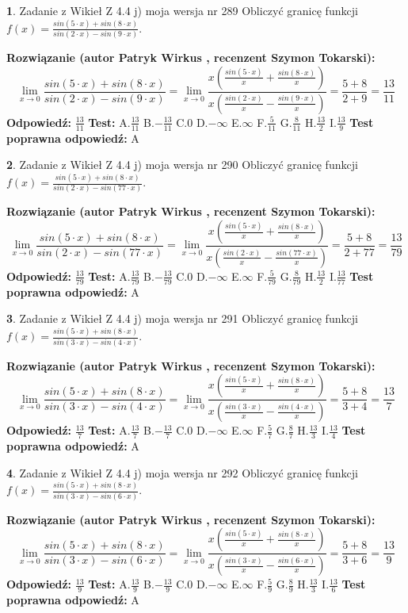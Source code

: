 \documentclass[12pt, a4paper]{article}
\theoremstyle{definition} %
\newtheorem{zad}{}
\newcommand{\zadStart}[1]{\begin{zad}#1\newline}
\newcommand{\zadStop}{\end{zad}}
\newcommand{\rozwStart}[2]{\noindent \textbf{Rozwiązanie (autor #1 , recenzent #2): }\newline}
\newcommand{\rozwStop}{\newline}
\newcommand{\odpStart}{\noindent \textbf{Odpowiedź:}\newline}
\newcommand{\odpStop}{\newline}
\newcommand{\testStart}{\noindent \textbf{Test:}\newline}
\newcommand{\testStop}{\newline}
\newcommand{\kluczStart}{\noindent \textbf{Test poprawna odpowiedź:}\newline}
\newcommand{\kluczStop}{\newline}
\begin{document}
\zadStart{Zadanie z Wikieł Z 4.4 j) moja wersja nr 289}
Obliczyć granicę funkcji $f(x)=\frac{sin(5\cdot x) +sin(8\cdot x)}{sin(2\cdot x) -sin(9\cdot x)}$.
\zadStop
\rozwStart{Patryk Wirkus}{Szymon Tokarski}
$$\lim\limits_{x\to 0}\frac{sin(5\cdot x) +sin(8\cdot x)}{sin(2\cdot x) -sin(9\cdot x)}=\lim\limits_{x\to 0}\frac{x(\frac{sin(5\cdot x)}{x}+\frac{sin(8\cdot x)}{x})}{x(\frac{sin(2\cdot x)}{x}-\frac{sin(9\cdot x)}{x})}=\frac{5+8}{2+9} = \frac{13}{11}$$
\rozwStop
\odpStart
$\frac{13}{11}$
\odpStop
\testStart
A.$\frac{13}{11}$
B.$-\frac{13}{11}$
C.$0$
D.$-\infty$
E.$\infty$
F.$\frac{5}{11}$
G.$\frac{8}{11}$
H.$\frac{13}{2}$
I.$\frac{13}{9}$
\testStop
\kluczStart
A
\kluczStop



\zadStart{Zadanie z Wikieł Z 4.4 j) moja wersja nr 290}
Obliczyć granicę funkcji $f(x)=\frac{sin(5\cdot x) +sin(8\cdot x)}{sin(2\cdot x) -sin(77\cdot x)}$.
\zadStop
\rozwStart{Patryk Wirkus}{Szymon Tokarski}
$$\lim\limits_{x\to 0}\frac{sin(5\cdot x) +sin(8\cdot x)}{sin(2\cdot x) -sin(77\cdot x)}=\lim\limits_{x\to 0}\frac{x(\frac{sin(5\cdot x)}{x}+\frac{sin(8\cdot x)}{x})}{x(\frac{sin(2\cdot x)}{x}-\frac{sin(77\cdot x)}{x})}=\frac{5+8}{2+77} = \frac{13}{79}$$
\rozwStop
\odpStart
$\frac{13}{79}$
\odpStop
\testStart
A.$\frac{13}{79}$
B.$-\frac{13}{79}$
C.$0$
D.$-\infty$
E.$\infty$
F.$\frac{5}{79}$
G.$\frac{8}{79}$
H.$\frac{13}{2}$
I.$\frac{13}{77}$
\testStop
\kluczStart
A
\kluczStop



\zadStart{Zadanie z Wikieł Z 4.4 j) moja wersja nr 291}
Obliczyć granicę funkcji $f(x)=\frac{sin(5\cdot x) +sin(8\cdot x)}{sin(3\cdot x) -sin(4\cdot x)}$.
\zadStop
\rozwStart{Patryk Wirkus}{Szymon Tokarski}
$$\lim\limits_{x\to 0}\frac{sin(5\cdot x) +sin(8\cdot x)}{sin(3\cdot x) -sin(4\cdot x)}=\lim\limits_{x\to 0}\frac{x(\frac{sin(5\cdot x)}{x}+\frac{sin(8\cdot x)}{x})}{x(\frac{sin(3\cdot x)}{x}-\frac{sin(4\cdot x)}{x})}=\frac{5+8}{3+4} = \frac{13}{7}$$
\rozwStop
\odpStart
$\frac{13}{7}$
\odpStop
\testStart
A.$\frac{13}{7}$
B.$-\frac{13}{7}$
C.$0$
D.$-\infty$
E.$\infty$
F.$\frac{5}{7}$
G.$\frac{8}{7}$
H.$\frac{13}{3}$
I.$\frac{13}{4}$
\testStop
\kluczStart
A
\kluczStop



\zadStart{Zadanie z Wikieł Z 4.4 j) moja wersja nr 292}
Obliczyć granicę funkcji $f(x)=\frac{sin(5\cdot x) +sin(8\cdot x)}{sin(3\cdot x) -sin(6\cdot x)}$.
\zadStop
\rozwStart{Patryk Wirkus}{Szymon Tokarski}
$$\lim\limits_{x\to 0}\frac{sin(5\cdot x) +sin(8\cdot x)}{sin(3\cdot x) -sin(6\cdot x)}=\lim\limits_{x\to 0}\frac{x(\frac{sin(5\cdot x)}{x}+\frac{sin(8\cdot x)}{x})}{x(\frac{sin(3\cdot x)}{x}-\frac{sin(6\cdot x)}{x})}=\frac{5+8}{3+6} = \frac{13}{9}$$
\rozwStop
\odpStart
$\frac{13}{9}$
\odpStop
\testStart
A.$\frac{13}{9}$
B.$-\frac{13}{9}$
C.$0$
D.$-\infty$
E.$\infty$
F.$\frac{5}{9}$
G.$\frac{8}{9}$
H.$\frac{13}{3}$
I.$\frac{13}{6}$
\testStop
\kluczStart
A
\kluczStop
\end{document}

